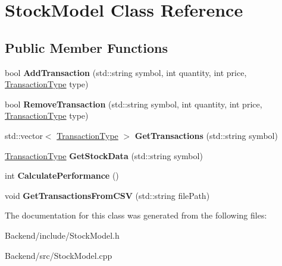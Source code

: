 \hypertarget{class_stock_model}{}\section{Stock\+Model Class Reference}
\label{class_stock_model}
\subsection*{Public Member Functions}
\begin{DoxyCompactItemize}
\item 
\mbox{\label{class_stock_model_aa5de5466e50f2bba375387dd35158b9d}} 
bool {\bfseries Add\+Transaction} (std\+::string symbol, int quantity, int price, \mbox{\hyperlink{class_transaction_type}{Transaction\+Type}} type)
\item 
\mbox{\label{class_stock_model_a2ace2720dc1742b8d563b96bb2e81eec}} 
bool {\bfseries Remove\+Transaction} (std\+::string symbol, int quantity, int price, \mbox{\hyperlink{class_transaction_type}{Transaction\+Type}} type)
\item 
\mbox{\label{class_stock_model_afcd1e771bc7417eb735ab383d24d4988}} 
std\+::vector$<$ \mbox{\hyperlink{class_transaction_type}{Transaction\+Type}} $>$ {\bfseries Get\+Transactions} (std\+::string symbol)
\item 
\mbox{\label{class_stock_model_ac892a9e35bc731342d92c84f5e0bfff6}} 
\mbox{\hyperlink{class_transaction_type}{Transaction\+Type}} {\bfseries Get\+Stock\+Data} (std\+::string symbol)
\item 
\mbox{\label{class_stock_model_af9ac92e3e10b39f999ea5a41a96b7b9c}} 
int {\bfseries Calculate\+Performance} ()
\item 
\mbox{\label{class_stock_model_a8ce359297d4d2c8fcb0ad6889664b360}} 
void {\bfseries Get\+Transactions\+From\+C\+SV} (std\+::string file\+Path)
\end{DoxyCompactItemize}


The documentation for this class was generated from the following files\+:\begin{DoxyCompactItemize}
\item 
Backend/include/Stock\+Model.\+h\item 
Backend/src/Stock\+Model.\+cpp\end{DoxyCompactItemize}
